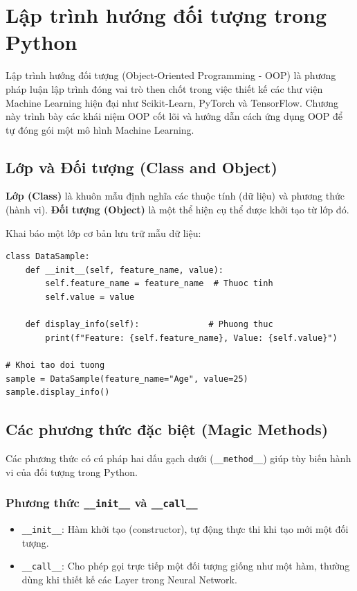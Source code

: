 \chapter{Lập trình hướng đối tượng trong Python}
\label{chap:oop}

Lập trình hướng đối tượng (Object-Oriented Programming - OOP) là phương pháp luận lập trình đóng vai trò then chốt trong việc thiết kế các thư viện Machine Learning hiện đại như Scikit-Learn, PyTorch và TensorFlow. Chương này trình bày các khái niệm OOP cốt lõi và hướng dẫn cách ứng dụng OOP để tự đóng gói một mô hình Machine Learning.

\section{Lớp và Đối tượng (Class and Object)}

\begin{definition}
\textbf{Lớp (Class)} là khuôn mẫu định nghĩa các thuộc tính (dữ liệu) và phương thức (hành vi). \textbf{Đối tượng (Object)} là một thể hiện cụ thể được khởi tạo từ lớp đó.
\end{definition}

\begin{example}
Khai báo một lớp cơ bản lưu trữ mẫu dữ liệu:
\end{example}

\begin{lstlisting}[caption={Khai báo Class và tạo Object trong Python}]
class DataSample:
    def __init__(self, feature_name, value):
        self.feature_name = feature_name  # Thuoc tinh
        self.value = value

    def display_info(self):              # Phuong thuc
        print(f"Feature: {self.feature_name}, Value: {self.value}")

# Khoi tao doi tuong
sample = DataSample(feature_name="Age", value=25)
sample.display_info()
\end{lstlisting}

\section{Các phương thức đặc biệt (Magic Methods)}

Các phương thức có cú pháp hai dấu gạch dưới (\texttt{\_\_method\_\_}) giúp tùy biến hành vi của đối tượng trong Python.

\subsection{Phương thức \texttt{\_\_init\_\_} và \texttt{\_\_call\_\_}}
\begin{itemize}
    \item \texttt{\_\_init\_\_}: Hàm khởi tạo (constructor), tự động thực thi khi tạo mới một đối tượng.
    \item \texttt{\_\_call\_\_}: Cho phép gọi trực tiếp một đối tượng giống như một hàm, thường dùng khi thiết kế các Layer trong Neural Network.
\end{itemize}

